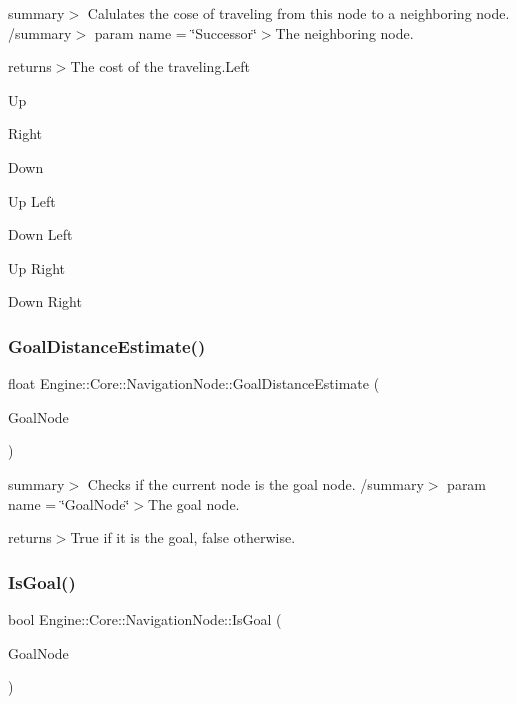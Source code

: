 summary$>$ Calulates the cose of traveling from this node to a neighboring node. /summary$>$ param name = \char`\"{}\+Successor\char`\"{}$>$The neighboring node.

returns$>$The cost of the traveling.Left

Up

Right

Down

Up Left

Down Left

Up Right

Down Right \mbox{\label{struct_engine_1_1_core_1_1_navigation_node_acd420576ac7c916755d9c7a9908a6aad}} 
\subsubsection{\texorpdfstring{Goal\+Distance\+Estimate()}{GoalDistanceEstimate()}}
{\footnotesize\ttfamily float Engine\+::\+Core\+::\+Navigation\+Node\+::\+Goal\+Distance\+Estimate (\begin{DoxyParamCaption}\item[{\hyperlink{struct_engine_1_1_core_1_1_navigation_node}{Navigation\+Node} \&}]{Goal\+Node }\end{DoxyParamCaption})}

summary$>$ Checks if the current node is the goal node. /summary$>$ param name = \char`\"{}\+Goal\+Node\char`\"{}$>$The goal node.

returns$>$True if it is the goal, false otherwise.\mbox{\label{struct_engine_1_1_core_1_1_navigation_node_aa838e27a48677c1359fc1bab0b8a8591}} 
\subsubsection{\texorpdfstring{Is\+Goal()}{IsGoal()}}
{\footnotesize\ttfamily bool Engine\+::\+Core\+::\+Navigation\+Node\+::\+Is\+Goal (\begin{DoxyParamCaption}\item[{\hyperlink{struct_engine_1_1_core_1_1_navigation_node}{Navigation\+Node} \&}]{Goal\+Node }\end{DoxyParamCaption})}

